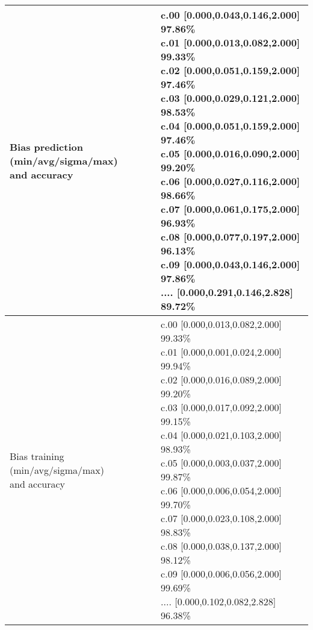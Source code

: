 \begin{center}
\begin{tabular}{|l|l|}
\hline
\makecell{Bias prediction (min/avg/sigma/max)\\and accuracy}&\makecell{c.00 [0.000,0.043,0.146,2.000] 97.86\%\\
c.01 [0.000,0.013,0.082,2.000] 99.33\%\\
c.02 [0.000,0.051,0.159,2.000] 97.46\%\\
c.03 [0.000,0.029,0.121,2.000] 98.53\%\\
c.04 [0.000,0.051,0.159,2.000] 97.46\%\\
c.05 [0.000,0.016,0.090,2.000] 99.20\%\\
c.06 [0.000,0.027,0.116,2.000] 98.66\%\\
c.07 [0.000,0.061,0.175,2.000] 96.93\%\\
c.08 [0.000,0.077,0.197,2.000] 96.13\%\\
c.09 [0.000,0.043,0.146,2.000] 97.86\%\\
.... [0.000,0.291,0.146,2.828] 89.72\%\\
}\\

\hline
\makecell{Bias training (min/avg/sigma/max)\\and accuracy}&\makecell{c.00 [0.000,0.013,0.082,2.000] 99.33\%\\
c.01 [0.000,0.001,0.024,2.000] 99.94\%\\
c.02 [0.000,0.016,0.089,2.000] 99.20\%\\
c.03 [0.000,0.017,0.092,2.000] 99.15\%\\
c.04 [0.000,0.021,0.103,2.000] 98.93\%\\
c.05 [0.000,0.003,0.037,2.000] 99.87\%\\
c.06 [0.000,0.006,0.054,2.000] 99.70\%\\
c.07 [0.000,0.023,0.108,2.000] 98.83\%\\
c.08 [0.000,0.038,0.137,2.000] 98.12\%\\
c.09 [0.000,0.006,0.056,2.000] 99.69\%\\
.... [0.000,0.102,0.082,2.828] 96.38\%\\
}\\
\hline
\end{tabular}\
\end{center}
